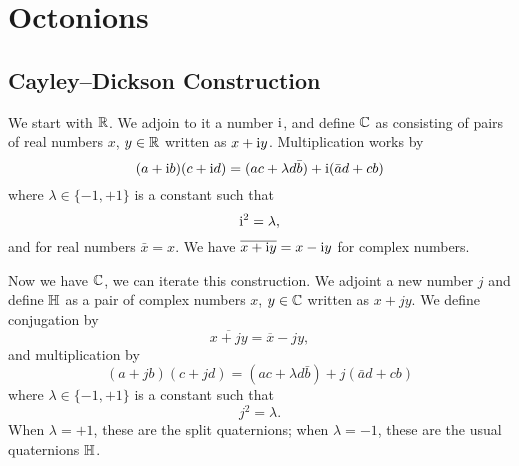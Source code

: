\chapter{Octonions}

\section{Cayley--Dickson Construction}

We start with $\mathbb{R}$. We adjoin to it a number $\mathrm{i}$, and define $\mathbb{C}$ as
consisting of pairs of real numbers $x$, $y\in\mathbb{R}$ written as $x + \mathrm{i} y$.
Multiplication works by
\begin{equation}
(a + \mathrm{i} b)(c + \mathrm{i} d) = (ac + \lambda d\bar{b}) + \mathrm{i}(\bar{a}d + cb) 
\end{equation}
where $\lambda\in\{-1,+1\}$ is a constant such that
\begin{equation}
\mathrm{i}^{2} = \lambda,
\end{equation}
and for real numbers $\bar{x}=x$. We have $\overline{x + \mathrm{i} y} = x - \mathrm{i} y$
for complex numbers.

Now we have $\mathbb{C}$, we can iterate this construction. We adjoint a new
number $j$ and define $\mathbb{H}$ as a pair of complex numbers $x$, $y\in\mathbb{C}$
written as $x + jy$. We define conjugation by
\begin{equation}
\overline{x + jy} = \overline{x} - jy,
\end{equation}
and multiplication by
\begin{equation}
(a + j b)(c + j d) = (ac + \lambda d\bar{b}) + j(\bar{a}d + cb) 
\end{equation}
where $\lambda\in\{-1,+1\}$ is a constant such that
\begin{equation}
j^{2} = \lambda.
\end{equation}
When $\lambda=+1$, these are the split quaternions; when $\lambda=-1$,
these are the usual quaternions $\mathbb{H}$.

